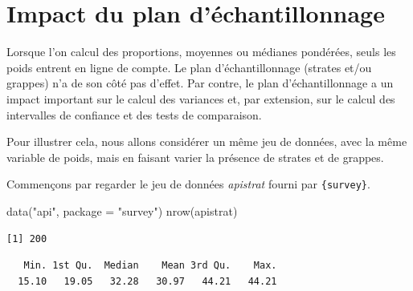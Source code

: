 \documentclass[
  letterpaper,
  DIV=11,
  numbers=noendperiod,
  oneside]{scrreprt}
\newenvironment{Shaded}{\begin{snugshade}}{\end{snugshade}}
\newcommand{\AttributeTok}[1]{\textcolor[rgb]{0.40,0.45,0.13}{#1}}
\newcommand{\FunctionTok}[1]{\textcolor[rgb]{0.28,0.35,0.67}{#1}}
\newcommand{\NormalTok}[1]{\textcolor[rgb]{0.00,0.23,0.31}{#1}}
\newcommand{\SpecialCharTok}[1]{\textcolor[rgb]{0.37,0.37,0.37}{#1}}
\newcommand{\StringTok}[1]{\textcolor[rgb]{0.13,0.47,0.30}{#1}}
\begin{document}
\hypertarget{impact-du-plan-duxe9chantillonnage}{%
\section{Impact du plan
d'échantillonnage}\label{impact-du-plan-duxe9chantillonnage}}

Lorsque l'on calcul des proportions, moyennes ou médianes pondérées,
seuls les poids entrent en ligne de compte. Le plan d'échantillonnage
(strates et/ou grappes) n'a de son côté pas d'effet. Par contre, le plan
d'échantillonnage a un impact important sur le calcul des variances et,
par extension, sur le calcul des intervalles de confiance et des tests
de comparaison.

Pour illustrer cela, nous allons considérer un même jeu de données, avec
la même variable de poids, mais en faisant varier la présence de strates
et de grappes.

Commençons par regarder le jeu de données \emph{apistrat} fourni par
\texttt{\{survey\}}.

\begin{Shaded}
\begin{Highlighting}[]
\FunctionTok{data}\NormalTok{(}\StringTok{"api"}\NormalTok{, }\AttributeTok{package =} \StringTok{"survey"}\NormalTok{)}
\FunctionTok{nrow}\NormalTok{(apistrat)}
\end{Highlighting}
\end{Shaded}

\begin{verbatim}
[1] 200
\end{verbatim}

\begin{Shaded}
\end{Shaded}

\begin{verbatim}
   Min. 1st Qu.  Median    Mean 3rd Qu.    Max. 
  15.10   19.05   32.28   30.97   44.21   44.21 
\end{verbatim}

\begin{Shaded}
\end{Shaded}
\end{document}
